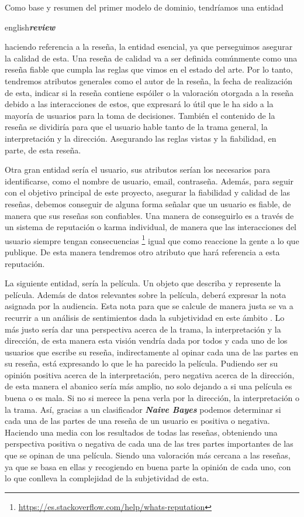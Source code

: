 Como base y resumen del primer modelo de dominio, tendríamos una entidad \begin{otherlanguage}
{english}\textit{\textbf{review}}\end{otherlanguage} haciendo referencia a la reseña, la entidad 
esencial, ya que perseguimos asegurar la calidad de esta. Una reseña de calidad va a ser definida 
comúnmente como una reseña fiable que cumpla las reglas que vimos en el estado del arte. Por lo tanto, 
tendremos atributos generales como el autor de la reseña, la fecha de realización de esta, indicar si 
la reseña contiene espóiler o la valoración otorgada a la reseña debido a las interacciones de estos, 
que expresará lo útil que le ha sido a la mayoría de usuarios para la toma de decisiones. También el 
contenido de la reseña se dividiría para que el usuario hable tanto de la trama general, la 
interpretación y la dirección. Asegurando las reglas vistas y la fiabilidad, en parte, de esta reseña.

Otra gran entidad sería el usuario, sus atributos serían los necesarios para identificarse, como el 
nombre de usuario, email, contraseña. Además, para seguir con el objetivo principal de este proyecto, 
asegurar la fiabilidad y calidad de las reseñas, debemos conseguir de alguna forma señalar que un 
usuario es fiable, de manera que sus reseñas son confiables. Una manera de conseguirlo es a través de 
un sistema de reputación o karma individual, de manera que las interacciones del usuario siempre tengan 
consecuencias \footnote{\url{https://es.stackoverflow.com/help/whats-reputation}} igual que como 
reaccione la gente a lo que publique. De esta manera tendremos otro atributo que hará referencia a esta 
reputación.

La siguiente entidad, sería la película. Un objeto que describa y represente la película. Además de 
datos relevantes sobre la película, deberá expresar la nota asignada por la audiencia. Esta nota para 
que se calcule de manera justa se va a recurrir a un análisis de sentimientos dada la subjetividad en 
este ámbito \cite{SubjTV}. Lo más justo sería dar una perspectiva acerca de la trama, la interpretación 
y la dirección, de esta manera esta visión vendría dada por todos y cada uno de los usuarios que 
escribe su reseña, indirectamente al opinar cada una de las partes en su reseña, está expresando lo que 
le ha parecido la película. Pudiendo ser su opinión positiva acerca de la interpretación, pero negativa 
acerca de la dirección, de esta manera el abanico sería más amplio, no solo dejando a si una película 
es buena o es mala. Si no si merece la pena verla por la dirección, la interpretación o la trama. Así, 
gracias a un clasificador \textbf{\textit{Naive Bayes}} \cite{TwNavieB} podemos determinar si cada una 
de las partes de una reseña de un usuario es positiva o negativa. Haciendo una media con los resultados 
de todas las reseñas, obteniendo una perspectiva positiva o negativa de cada una de las tres partes 
importantes de las que se opinan de una película. Siendo una valoración más cercana a las reseñas, ya 
que se basa en ellas y recogiendo en buena parte la opinión de cada uno, con lo que conlleva la 
complejidad de la subjetividad de esta.

